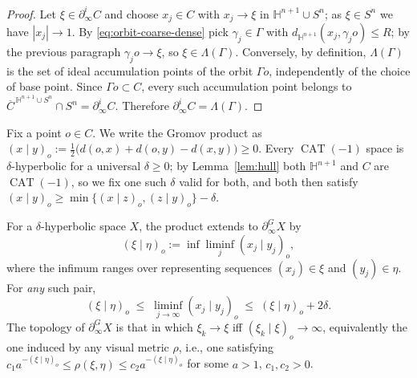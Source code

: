 \documentclass[12pt,oneside,a4paper]{article}
\theoremstyle{mytheorem}
\theoremstyle{remark}
\theoremstyle{definition}
\begin{document}
\begin{proof}
Let \(\xi\in\partial_\infty^{i}C\) and choose \(x_j\in C\) with
\(x_j\to\xi\) in \(\mathbb H^{n+1}\cup S^n\); as \(\xi\in S^n\) we have
\(|x_j|\to1\).  By \eqref{eq:orbit-coarse-dense} pick
\(\gamma_j\in\Gamma\) with
\(d_{\mathbb H^{n+1}}(x_j,\gamma_j o)\leq R\); by the previous
paragraph \(\gamma_j o\to\xi\), so \(\xi\in\Lambda(\Gamma)\).
Conversely, by definition, $\Lambda(\Gamma)$ is the set of ideal accumulation points of the orbit $\Gamma o$, independently of the choice of base point. Since $\Gamma o\subset C$, every such accumulation point belongs to
$\overline C^{\,\mathbb H^{n+1}\cup S^n}\cap S^n=\partial_\infty^{i}C.$
Therefore \(\partial_\infty^{i}C=\Lambda(\Gamma)\).
\end{proof}



Fix a point $o\in C$. We write the Gromov product as
\((x\mid y)_o:=\tfrac12\bigl(d(o,x)+d(o,y)-d(x,y)\bigr)\geq0\).
Every \(\operatorname{CAT}(-1)\) space is
\(\delta\)-hyperbolic for a universal \(\delta\geq0\); by
Lemma~\ref{lem:hull} both \(\mathbb H^{n+1}\) and \(C\) are
\(\operatorname{CAT}(-1)\), so we fix one such \(\delta\) valid for both,
and both then satisfy
\((x\mid y)_o\geq\min\{(x\mid z)_o,(z\mid y)_o\}-\delta\).

For a $\delta$-hyperbolic space \(X\), the product extends to
\(\partial_\infty^{G}X\) by
\[
 (\xi\mid\eta)_o:=\inf\liminf_j(x_j\mid y_j)_o,
\]
where the infimum ranges over representing sequences
\((x_j)\in\xi\) and \((y_j)\in\eta\). For \emph{any} such pair,
\begin{equation}\label{eq:BL-boundary-estimate}
 (\xi\mid\eta)_o
 \;\leq\;\liminf_{j\to\infty}(x_j\mid y_j)_o
 \;\leq\;(\xi\mid\eta)_o+2\delta .
\end{equation}
The topology of \(\partial_\infty^{G}X\) is that in which
\(\xi_k\to\xi\) iff \((\xi_k\mid\xi)_o\to\infty\), equivalently the one
induced by any visual metric \(\rho\), i.e., one satisfying
\(c_1a^{-(\xi\mid\eta)_o}\leq\rho(\xi,\eta)\leq c_2a^{-(\xi\mid\eta)_o}\)
for some \(a>1\), \(c_1,c_2>0\).
\end{document}
